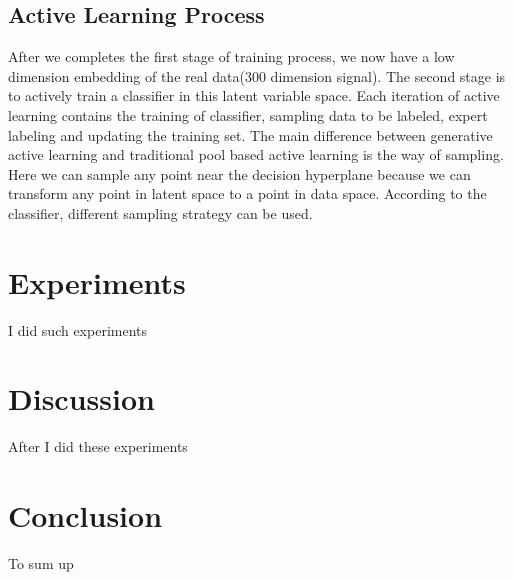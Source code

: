 \documentclass[letterpaper]{article}
\begin{document}
\subsection{Active Learning Process}
After we completes the first stage of training process, we now have a low dimension embedding of the real data(300 dimension signal). The second stage is to actively train a classifier in this latent variable space. Each iteration of active learning contains the training of classifier, sampling data to be labeled, expert labeling and updating the training set. The main difference between generative active learning and traditional pool based active learning is the way of sampling. Here we can sample any point near the decision hyperplane because we can transform any point in latent space to a point in data space. According to the classifier, different sampling strategy can be used.

\section{Experiments}
I did such experiments

\section{Discussion}
After I did these experiments

\section{Conclusion}
To sum up



\end{document}
